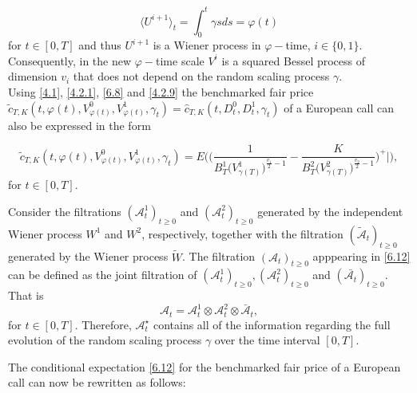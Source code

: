 \documentclass[a4 paper, 12pt]{report}
\theoremstyle{plain}
\begin{document}
\begin{equation}\label{4.2.11}
\langle U^{i+1}\rangle_t = \int_0^t\gamma sds = \varphi(t)
\end{equation}
for $t\in[0,T]$ and thus $U^{i+1}$ is a Wiener process in $\varphi-$time, $i\in\{0,1\}$. Consequently, in the new $\varphi-$time scale $V^i$ is a squared Bessel  process of dimension $v_i$ that does not depend on the random scaling  process $\gamma$.\\
Using \eqref{4.1}, \eqref{4.2.1}, \eqref{6.8} and \eqref{4.2.9} the benchmarked fair price $\tilde{c}_{T,K}(t,\varphi(t), V^0_{\varphi(t)}, V^1_{\varphi(t)},\gamma_t) = \hat{c}_{T,K}(t,D_t^0,D_t^1,\gamma_t)$ of a European call can also be expressed in the form

\begin{equation}\label{6.12}
\tilde{c}_{T,K}(t,\varphi(t),V^0_{\varphi(t)},V^1_{\varphi(t)},\gamma_t) = E\bigg(\bigg(\frac{1}{B_T^1\bigg(V^1_{\gamma(T)}\bigg)^{\frac{v_1}{2}-1}} - \frac{K}{B_T^2\bigg(V^2_{\gamma(T)}\bigg)^{\frac{v_2}{2}-1}}\bigg)^+\bigg|\bigg), 
\end{equation}
for $t\in[0,T]$.\\
\noindent
\par Consider the filtrations $(\mathcal{A}^1_t)_{t\geq 0}$ and  $(\mathcal{A}^2_t)_{t\geq 0}$ generated by the independent Wiener process $W^1$ and $W^2$, respectively, together with the filtration $(\tilde{\mathcal{A}}_t)_{t\geq 0}$ generated by the Wiener process $\tilde{W}$. The filtration $(\mathcal{A}_t)_{t\geq 0}$ apppearing in \eqref{6.12} can be defined as the joint filtration of $(\mathcal{A}^1_t)_{t\geq 0}, (\mathcal{A}_t^2)_{t\geq 0}$ and $(\bar{\mathcal{A}_t})_{t\geq 0}$. That is
$$
\mathcal{A}_t  = \mathcal{A}_t^1\otimes \mathcal{A}_t^2\otimes\bar{\mathcal{A}}_t,
$$
for $t\in[0,T]$. Therefore, $\mathcal{A}_t^\star$ contains all of the information regarding the full evolution of the random scaling process $\gamma$ over the time interval $[0,T]$.\\
\par The conditional expectation \eqref{6.12} %
for the benchmarked fair price of a European call can now be rewritten as follows:
\end{document}
